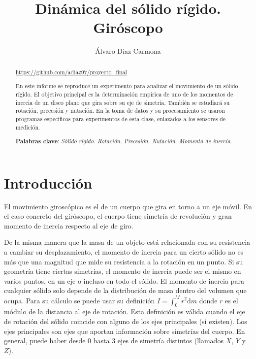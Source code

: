 \documentclass[a4paper]{article}
\begin{document}
\title{Dinámica del sólido rígido. Giróscopo}
\author{Álvaro Díaz Carmona}
\maketitle
\begin{abstract}
\url{https://github.com/adiaz97/proyecto_final}

En este informe se reproduce un experimento para analizar el movimiento de un sólido rígido. El objetivo principal es la determinación empírica de uno de los momentos de inercia de un disco plano que gira sobre su eje de simetría. También se estudiará su rotación, precesión y nutación. En la toma de datos y su procesamiento se usaron programas específicos para experimentos de esta clase, enlazados a los sensores de medición. 

\textbf{Palabras clave}: \textit{Sólido rígido. Rotación. Precesión. Nutación. Momento de inercia.}
\end{abstract}

\section{Introducción}
El movimiento giroscópico es el de un cuerpo que gira en torno a un eje móvil. En el caso concreto del giróscopo, el cuerpo tiene simetría de revolución y gran momento de inercia respecto al eje de giro. 

De la misma manera que la masa de un objeto está relacionada con su resistencia a cambiar su desplazamiento, el momento de inercia para un cierto sólido no es más que una magnitud que mide su resistencia a la rotación en un punto. Si su geometría tiene ciertas simetrías, el momento de inercia puede ser el mismo en varios puntos, en un eje o incluso en todo el sólido. El momento de inercia para cualquier sólido solo depende de la distribución de masa dentro del volumen que ocupa. Para su cálculo se puede usar su definición $I=\int^{M}_{0} r^2\mathrm{d}m$ donde $r$ es el módulo de la distancia al eje de rotación. Esta definición es válida cuando el eje de rotación del sólido coincide con alguno de los ejes principales (si existen). Los ejes principales son ejes que aportan información sobre simetrías del cuerpo. En general, puede haber desde 0 hasta 3 ejes de simetría distintos (llamados $X$, $Y$ y $Z$). 
\end{document}
